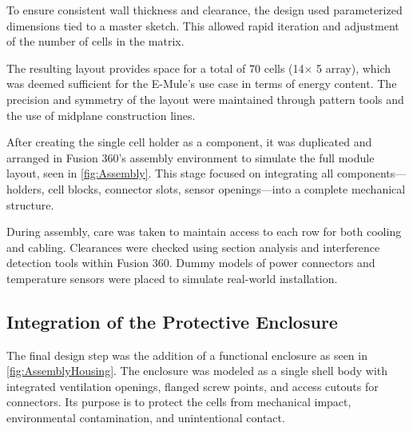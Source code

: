 To ensure consistent wall thickness and clearance, the design used parameterized dimensions tied to a master sketch. This allowed rapid iteration and adjustment of the number of cells in the matrix. 

The resulting layout provides space for a total of 70 cells (14× 5 array), which was deemed sufficient for the E-Mule’s use case in terms of energy content. The precision and symmetry of the layout were maintained through pattern tools and the use of midplane construction lines.


\addtocounter{page}{1}

After creating the single cell holder as a component, it was duplicated and arranged in Fusion 360’s assembly environment to simulate the full module layout, seen in \ref{fig:Assembly}. This stage focused on integrating all components—holders, cell blocks, connector slots, sensor openings—into a complete mechanical structure.


During assembly, care was taken to maintain access to each row for both cooling and cabling. Clearances were checked using section analysis and interference detection tools within Fusion 360. Dummy models of power connectors and temperature sensors were placed to simulate real-world installation.



\subsection{Integration of the Protective Enclosure}

\addtocounter{page}{1}
The final design step was the addition of a functional enclosure as seen in \ref{fig:AssemblyHousing}. The enclosure was modeled as a single shell body with integrated ventilation openings, flanged screw points, and access cutouts for connectors. Its purpose is to protect the cells from mechanical impact, environmental contamination, and unintentional contact.

